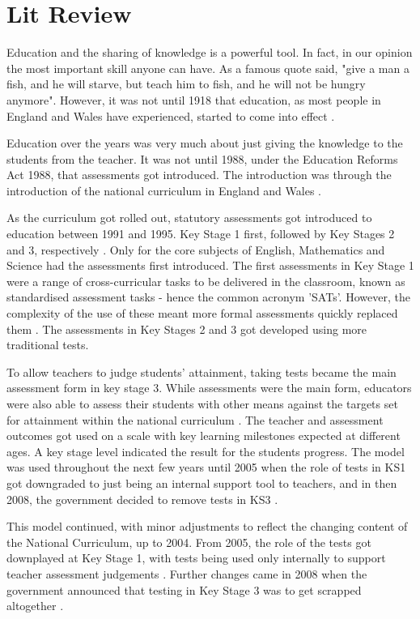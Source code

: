 \chapter{Lit Review}
	\label{chap:lit_review}
	Education and the sharing of knowledge is a powerful tool. In fact, in our opinion the most important skill anyone can have. As a famous quote said, "give a man a fish, and he will starve, but teach him to fish, and he will not be hungry anymore". However, it was not until 1918 that education, as most people in England and Wales have experienced, started to come into effect \cite{education1918}.
	
	Education over the years was very much about just giving the knowledge to the students from the teacher. It was not until 1988, under the Education Reforms Act 1988, that assessments got introduced. The introduction was through the introduction of the national curriculum in England and Wales \cite{education1988}.
	
	As the curriculum got rolled out, statutory assessments got introduced to education between 1991 and 1995. Key Stage 1 first, followed by Key Stages 2 and 3, respectively \cite{hutchison1994reliable, dillon2011becoming}. Only for the core subjects of English, Mathematics and Science had the assessments first introduced. The first assessments in Key Stage 1 were a range of cross-curricular tasks to be delivered in the classroom, known as standardised assessment tasks - hence the common acronym 'SATs'. However, the complexity of the use of these meant more formal assessments quickly replaced them \cite{hutchison1994reliable, dillon2011becoming}. The assessments in Key Stages 2 and 3 got developed using more traditional tests.
	
	To allow teachers to judge students' attainment, taking tests became the main assessment form in key stage 3. While assessments were the main form, educators were also able to assess their students with other means against the targets set for attainment within the national curriculum \cite{dillon2011becoming}. The teacher and assessment outcomes got used on a scale with key learning milestones expected at different ages. A key stage level indicated the result for the students progress. The model was used throughout the next few years until 2005 when the role of tests in KS1 got downgraded to just being an internal support tool to teachers, and in then 2008, the government decided to remove tests in KS3 \cite{dillon2011becoming}.
	
	This model continued, with minor adjustments to reflect the changing content of the National Curriculum, up to 2004. From 2005, the role of the tests got downplayed at Key Stage 1, with tests being used only internally to support teacher assessment judgements \cite{bbc_no_tests}. Further changes came in 2008 when the government announced that testing in Key Stage 3 was to get scrapped altogether \cite{bbc_tests_scrapped}.
	
